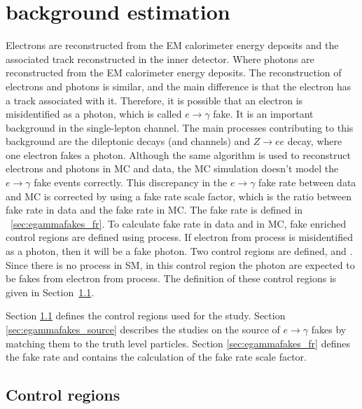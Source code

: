 \section{\efake background estimation}
\label{sec:background-estimation-efake}
Electrons are reconstructed from the EM calorimeter energy deposits and the associated track reconstructed in the inner detector. Where photons are reconstructed from the EM calorimeter energy deposits. The reconstruction of electrons and photons is similar, and the main difference is that the electron has a track associated with it. Therefore, it is possible that an electron is misidentified as a photon, which is called $e\to\gamma$ fake. It is an important background in the single-lepton channel. The main processes contributing to this background are the \ttbar dileptonic decays (\chee and \chemu channels) and $Z\to ee$ decay, where one electron fakes a photon. Although the same algorithm is used to reconstruct electrons and photons in MC and data, the MC simulation doesn't model the $e\to\gamma$ fake events correctly. This discrepancy in the $e\to\gamma$ fake rate between data and MC is corrected by using a fake rate scale factor, which is the ratio between fake rate in data and the fake rate in MC. The fake rate is defined in ~\cref{sec:egammafakes_fr}. To calculate fake rate in data and in MC, fake enriched control regions are defined using \zee process. If electron from \zee process is misidentified as a photon, then it will be a fake photon. Two control regions are defined, \zee and \zegamma. Since there is no \zegamma process in SM, in this control region the photon are expected to be fakes from electron from \zee process. The definition of these control regions is given in Section~\ref{sec:egammafakes_cr}.


Section \ref{sec:egammafakes_cr} defines the control regions used for the study. 
Section \ref{sec:egammafakes_source} describes the studies on the source of $e\to\gamma$ fakes by matching them to the truth level particles. Section \ref{sec:egammafakes_fr} defines the fake rate and contains the calculation of the fake rate scale factor.

\subsection{Control regions}
\label{sec:egammafakes_cr}

